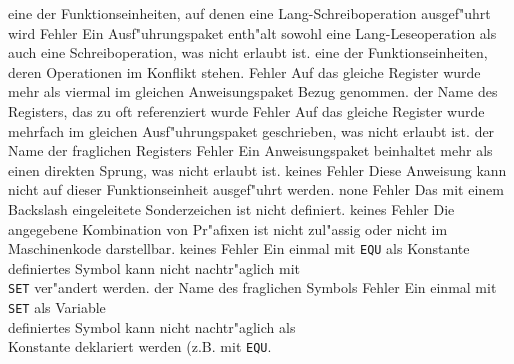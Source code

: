\documentclass[12pt,a4paper,twoside]{report}
\begin{document}
\begin{description}
               {eine der Funktionseinheiten, auf denen eine
                Lang-Schreiboperation ausgef"uhrt wird}
               {Fehler}
               {Ein Ausf"uhrungspaket enth"alt sowohl eine
                Lang-Leseoperation als auch eine Schreiboperation,
                was nicht erlaubt ist.}
               {eine der Funktionseinheiten, deren Operationen im
                Konflikt stehen.}
               {Fehler}
               {Auf das gleiche Register wurde mehr als viermal im
                gleichen Anweisungspaket Bezug genommen.}
               {der Name des Registers, das zu oft referenziert wurde}
               {Fehler}
               {Auf das gleiche Register wurde mehrfach im gleichen
                Ausf"uhrungspaket geschrieben, was nicht erlaubt ist.}
               {der Name der fraglichen Registers}
               {Fehler}
               {Ein Anweisungspaket beinhaltet mehr als einen direkten
                Sprung, was nicht erlaubt ist.}
               {keines}
               {Fehler}
               {Diese Anweisung kann nicht auf dieser Funktionseinheit
                ausgef"uhrt werden.}
               {none}
               {Fehler}
               {Das mit einem Backslash eingeleitete
	        Sonderzeichen ist nicht definiert.}
               {keines}
               {Fehler}
               {Die angegebene Kombination von Pr"afixen
	        ist nicht zul"assig oder nicht im
	        Maschinenkode darstellbar.}
               {keines}
               {Fehler}
               {Ein einmal mit {\tt EQU} als Konstante\\
                definiertes Symbol kann nicht nachtr"aglich mit\\
                {\tt SET} ver"andert werden.}
               {der Name des fraglichen Symbols}
               {Fehler}
               {Ein einmal mit {\tt SET} als Variable\\
                definiertes Symbol kann nicht nachtr"aglich als\\
                Konstante deklariert werden (z.B. mit {\tt EQU}.}

\end{description}
\end{document}
